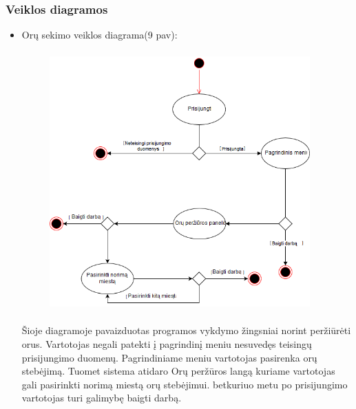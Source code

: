 \documentclass[oneside]{VUMIFPSkursinis}
\begin{document}
\subsubsection{Veiklos diagramos}
\begin{itemize}
\item Orų sekimo veiklos diagrama(9 pav):
	\begin{figure}[H]
	\centering	
	\includegraphics[width=10cm,height=10cm,keepaspectratio]{veiklos_diagrama_orai.png}
	\caption{}
	\label{}
	\end{figure}

Šioje diagramoje pavaizduotas programos vykdymo žingsniai norint peržiūrėti orus. Vartotojas negali patekti į pagrindinį meniu nesuvedęs teisingų prisijungimo duomenų. Pagrindiniame meniu vartotojas pasirenka orų stebėjimą. Tuomet sistema atidaro Orų peržūros langą kuriame vartotojas gali pasirinkti norimą miestą orų stebėjimui. betkuriuo metu po prisijungimo vartotojas turi galimybę baigti darbą.


\end{itemize}
\end{document}
